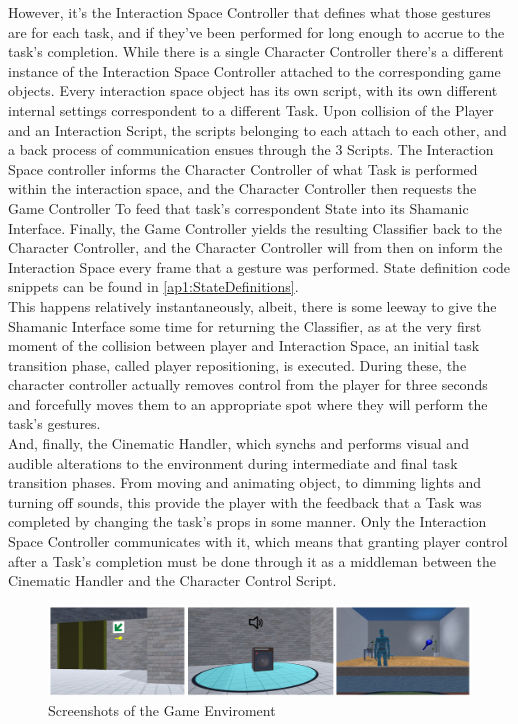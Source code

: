     However, it’s the Interaction Space Controller that defines what those gestures are for each task, and if they’ve been performed for long enough to accrue to the task’s completion. While there is a single Character Controller there’s a different instance of the Interaction Space Controller attached to the corresponding game objects. Every interaction space object has its own script, with its own different internal settings correspondent to a different Task. Upon collision of the Player and an Interaction Script, the scripts belonging to each attach to each other, and a back process of communication ensues through the 3 Scripts. The Interaction Space controller informs the Character Controller of what Task is performed within the interaction space, and the Character Controller then requests the Game Controller To feed that task’s correspondent State into its Shamanic Interface. Finally, the Game Controller yields the resulting Classifier back to the Character Controller, and the Character Controller will from then on inform the Interaction Space every frame that a gesture was performed. State definition code snippets can be found in \ref{ap1:StateDefinitions}.\\
    This happens relatively instantaneously, albeit, there is some leeway to give the Shamanic Interface some time for returning the Classifier, as at the very first moment of the collision between player and Interaction Space, an initial task transition phase, called player repositioning, is executed. During these, the character controller actually removes control from the player for three seconds and forcefully moves them to an appropriate spot where they will perform the task’s gestures.\\
    And, finally, the Cinematic Handler, which synchs and performs visual and audible alterations to the environment during intermediate and final task transition phases. From moving and animating object, to dimming lights and turning off sounds, this provide the player with the feedback that a Task was completed by changing the task’s props in some manner. Only the Interaction Space Controller communicates with it, which means that granting player control after a Task’s completion must be done through it as a middleman between the Cinematic Handler and the Character Control Script.\\

    \begin{figure}[ht]
        \centering
        \hspace*{-1cm}
        \includegraphics[width=0.8\paperwidth]{figures/IngameScreenshots.png}
        \caption{\label{fig:FigureScreenshots}Screenshots of the Game Enviroment}
    \end{figure}